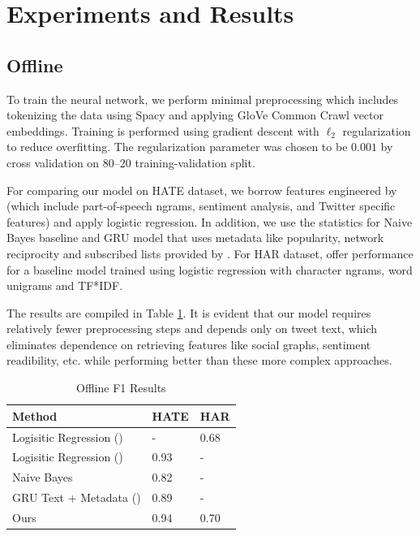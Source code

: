 \documentclass{article}
\begin{document}
  \section{Experiments and Results}
  \subsection{Offline}
  To train the neural network, we perform minimal preprocessing which includes tokenizing the data using Spacy and applying GloVe Common Crawl vector embeddings. 
  Training is performed using gradient descent with \(\ell_2\) regularization to reduce overfitting. The regularization parameter
  was chosen to be \(0.001\) by cross validation on 80--20 training-validation split.
  
  For comparing our model on HATE dataset, we borrow features engineered by \cite{hateoffensive} (which include part-of-speech ngrams, sentiment analysis, and Twitter specific features) and apply logistic regression. In addition, we use the statistics for
  Naive Bayes baseline and GRU model that uses metadata like popularity, network reciprocity and subscribed lists provided by \cite{founta2018unified}.
  For HAR dataset,
  \cite{kshirsagar2018predictive} offer performance for a baseline model trained using logistic regression with character ngrams, word unigrams and TF*IDF.

  The results are compiled in Table \ref{offline-res}. It is evident that our model requires relatively fewer preprocessing steps and depends only on tweet text, which eliminates dependence on
  retrieving features like social graphs, sentiment readibility, etc. while performing better than these more complex approaches.

  \begin{table}
    \caption{Offline F1 Results}
    \label{offline-res}
    \centering
    \begin{tabular}{lll}
      \toprule
      Method     & HATE     & HAR \\
      \midrule
      Logisitic Regression (\cite{kshirsagar2018predictive}) & - & 0.68\\
      Logisitic Regression (\cite{hateoffensive}) & 0.93 & -\\
      Naive Bayes & 0.82 & -\\
      GRU Text + Metadata (\cite{founta2018unified}) & 0.89 & -\\
      Ours & 0.94 & 0.70\\
      \bottomrule
    \end{tabular}
  \end{table}
\end{document}

